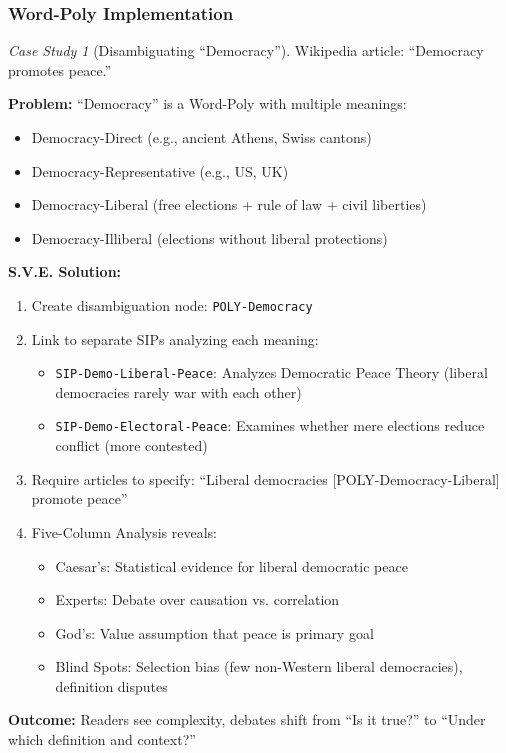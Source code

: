 \documentclass[11pt,a4paper]{article}
\theoremstyle{definition}
\theoremstyle{remark}
\newtheorem{casestudy}{Case Study}[section]
\newcommand{\SIP}{\textsc{SIP}}
\begin{document}
\subsubsection{Word-Poly Implementation}\label{sec:wordpoly_impl}

\begin{casestudy}[Disambiguating ``Democracy'']
Wikipedia article: ``Democracy promotes peace.''

\textbf{Problem:} ``Democracy'' is a Word-Poly with multiple meanings:
\begin{itemize}
    \item Democracy-Direct (e.g., ancient Athens, Swiss cantons)
    \item Democracy-Representative (e.g., US, UK)
    \item Democracy-Liberal (free elections + rule of law + civil liberties)
    \item Democracy-Illiberal (elections without liberal protections)
\end{itemize}

\textbf{S.V.E. Solution:}
\begin{enumerate}
    \item Create disambiguation node: \texttt{POLY-Democracy}
    \item Link to separate \SIP{}s analyzing each meaning:
    \begin{itemize}
        \item \texttt{SIP-Demo-Liberal-Peace}: Analyzes Democratic Peace Theory (liberal democracies rarely war with each other)
        \item \texttt{SIP-Demo-Electoral-Peace}: Examines whether mere elections reduce conflict (more contested)
    \end{itemize}
    \item Require articles to specify: ``Liberal democracies [POLY-Democracy-Liberal] promote peace''
    \item Five-Column Analysis reveals:
    \begin{itemize}
        \item Caesar's: Statistical evidence for liberal democratic peace
        \item Experts: Debate over causation vs. correlation
        \item God's: Value assumption that peace is primary goal
        \item Blind Spots: Selection bias (few non-Western liberal democracies), definition disputes
    \end{itemize}
\end{enumerate}

\textbf{Outcome:} Readers see complexity, debates shift from ``Is it true?'' to ``Under which definition and context?''
\end{casestudy}
\end{document}
